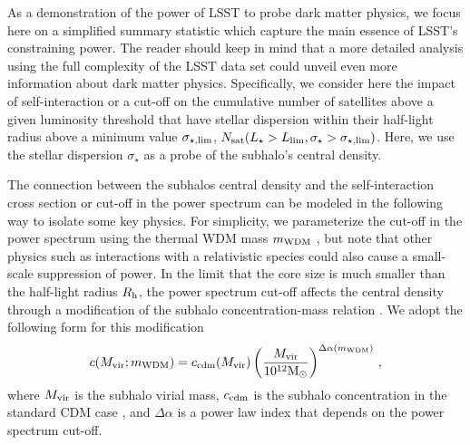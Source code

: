 As a demonstration of the power of LSST to probe dark matter physics, we focus here on a simplified summary statistic which capture the main essence of LSST's constraining power. The reader should keep in mind that a more detailed analysis using the full complexity of the LSST data set could unveil even more information about dark matter physics. Specifically, we consider here the impact of self-interaction or a cut-off on the cumulative number of satellites above a given luminosity threshold that have stellar dispersion within their half-light radius above a minimum value $\sigma_{\star,\rm lim}$, $N_{\rm sat}(L_\star>L_{\rm lim}, \sigma_\star> \sigma_{\star,\rm lim})$. Here, we use the stellar dispersion $\sigma_\star$ as a probe of the subhalo's central density.

The connection between the subhalos central density and the self-interaction cross section or cut-off in the power spectrum can be modeled in the following way to isolate some key physics. For simplicity, we parameterize the cut-off in the power spectrum using the thermal WDM mass $m_{\rm WDM}$ \citep[see e.g.][]{Bode:2000gq}, but note that other physics such as interactions with a relativistic species \citep[see e.g.][]{Boehm:2004th,Cyr-Racine:2015ihg} could also cause a small-scale suppression of power. In the limit that the core size is much smaller than the half-light radius $R_{\rm h}$, the power spectrum cut-off affects the central density through a modification of the subhalo concentration-mass relation \citep{Dunstan:2011bq,schneider2012,Lovell:2013ola,Bose:2016irl}. We adopt the following form for this modification  
\begin{equation}
c(M_{\rm vir};m_{\rm WDM}) = c_{\rm cdm}(M_{\rm vir})\left(\frac{M_{\rm vir}}{10^{12}{\rm M}_\odot}\right)^{\Delta\alpha(m_{\rm WDM})}\,,
\end{equation}
where $M_{\rm vir}$ is the subhalo virial mass, $c_{\rm cdm}$ is the subhalo concentration in the standard CDM case \citep{Moline:2016pbm}, and $\Delta\alpha$ is a power law index that depends on the power spectrum cut-off. 

